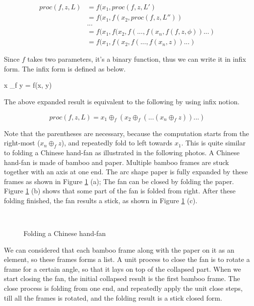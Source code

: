 \documentclass[UTF8]{article}
\begin{document}
\[
\begin{array}{rl}
proc(f, z, L) & = f(x_1, proc(f, z, L') \\
        & = f(x_1, f(x_2, proc(f, z, L'')) \\
        & ... \\
        & = f(x_1, f(x_2, f(..., f(x_n, f(f, z, \phi))...) \\
        & = f(x_1, f(x_2, f(..., f(x_n, z))...)
\end{array}
\]

Since $f$ takes two parameters, it's a binary function, thus we can write it in infix form. The infix
form is defined as below.

\be
x \oplus_f y = f(x, y)
\ee

The above expanded result is equivalent to the following by using infix notion.

\[
proc(f, z, L) = x_1 \oplus_f (x_2 \oplus_f (... (x_n \oplus_f z))...)
\]

Note that the parentheses are necessary, because the computation starts from the right-most ($x_n \oplus_f z$),
and repeatedly fold to left towards $x_1$. This is quite similar to folding a Chinese hand-fan as illustrated
in the following photos. A Chinese hand-fan is made of bamboo and paper. Multiple bamboo frames are stuck
together with an axis at one end. The arc shape paper is fully expanded by these frames as shown in Figure
\ref{fig:fold-fan} (a);
The fan can be closed by folding the paper. Figure \ref{fig:fold-fan} (b) shows that some part of the fan
is folded from right. After these folding finished, the fan results a stick, as shown in Figure \ref{fig:fold-fan} (c).

\begin{figure}[htbp]
    \centering
     \\
    \caption{Folding a Chinese hand-fan} \label{fig:fold-fan}
\end{figure}

We can considered that each bamboo frame along with the paper on it as an element, so these frames forms a
list. A unit process to close the fan is to rotate a frame for a certain angle, so that it lays on top
of the collapsed part. When we start closing the fan, the initial collapsed result is the first bamboo frame.
The close process is folding from one end, and repeatedly apply the unit close steps, till all the frames
is rotated, and the folding result is a stick closed form.
\end{document}
